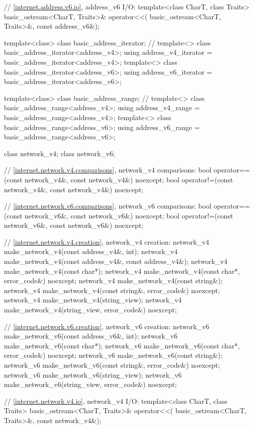 \begin{codeblock}
{{{{  // \ref{internet.address.v6.io}, address_v6 I/O:
  template<class CharT, class Traits>
    basic_ostream<CharT, Traits>& operator<<(
      basic_ostream<CharT, Traits>&, const address_v6&);

  template<class> class basic_address_iterator; // \notdef
  template<> class basic_address_iterator<address_v4>;
  using address_v4_iterator = basic_address_iterator<address_v4>;
  template<> class basic_address_iterator<address_v6>;
  using address_v6_iterator = basic_address_iterator<address_v6>;

  template<class> class basic_address_range; // \notdef
  template<> class basic_address_range<address_v4>;
  using address_v4_range = basic_address_range<address_v4>;
  template<> class basic_address_range<address_v6>;
  using address_v6_range = basic_address_range<address_v6>;

  class network_v4;
  class network_v6;

  // \ref{internet.network.v4.comparisons}, network_v4 comparisons:
  bool operator==(const network_v4&, const network_v4&) noexcept;
  bool operator!=(const network_v4&, const network_v4&) noexcept;

  // \ref{internet.network.v6.comparisons}, network_v6 comparisons:
  bool operator==(const network_v6&, const network_v6&) noexcept;
  bool operator!=(const network_v6&, const network_v6&) noexcept;

  // \ref{internet.network.v4.creation}, network_v4 creation:
  network_v4 make_network_v4(const address_v4&, int);
  network_v4 make_network_v4(const address_v4&, const address_v4&);
  network_v4 make_network_v4(const char*);
  network_v4 make_network_v4(const char*, error_code&) noexcept;
  network_v4 make_network_v4(const string&);
  network_v4 make_network_v4(const string&, error_code&) noexcept;
  network_v4 make_network_v4(string_view);
  network_v4 make_network_v4(string_view, error_code&) noexcept;

  // \ref{internet.network.v6.creation}, network_v6 creation:
  network_v6 make_network_v6(const address_v6&, int);
  network_v6 make_network_v6(const char*);
  network_v6 make_network_v6(const char*, error_code&) noexcept;
  network_v6 make_network_v6(const string&);
  network_v6 make_network_v6(const string&, error_code&) noexcept;
  network_v6 make_network_v6(string_view);
  network_v6 make_network_v6(string_view, error_code&) noexcept;

  // \ref{internet.network.v4.io}, network_v4 I/O:
  template<class CharT, class Traits>
    basic_ostream<CharT, Traits>& operator<<(
      basic_ostream<CharT, Traits>&, const network_v4&);

}}}}
\end{codeblock}
